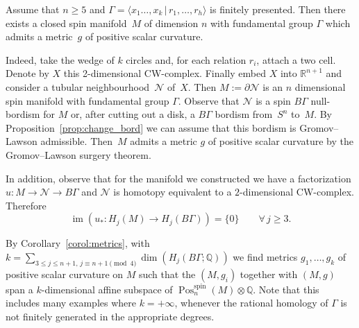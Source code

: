 \documentclass[pdftex]{sigma}
\numberwithin{equation}{section}
\def\QQ{\ensuremath{\mathbb{Q}}}
\def\RR{\ensuremath{\mathbb{R}}}
\newcommand{\rationals}{\mathbb{Q}}
\newcommand{\tensor}{\otimes}
\DeclareMathOperator{\Pos}{Pos}
\DeclareMathOperator{\im}{im}
\DeclareMathOperator{\spin}{spin}
\begin{document}
\begin{Example}\label{ex:given_pi1}
 Assume that $n\ge 5$ and $\Gamma=\langle x_1\dots,x_k\,|\,
 r_1,\dots,r_h\rangle$ is finitely presented. Then there
 exists a closed spin manifold~$M$ of dimension $n$ with fundamental group
 $\Gamma$ which admits a metric~$g$ of positive scalar curvature.

 Indeed, take the wedge of $k$ circles and, for each relation
 $r_i$, attach a two cell. Denote by $X$ this 2-dimensional CW-complex. Finally
 embed $X$ into $\RR^{n+1}$ and consider a
 tubular neighbour\-hood~$\mathcal{N}$ of~$X$. Then
 $M:=\partial\mathcal{N}$ is an $n$ dimensional spin manifold
 with fundamental group $\Gamma$. Observe that $\mathcal{N}$ is
 a spin $B\Gamma$ null-bordism for $M$ or, after cutting out a disk, a
 $B\Gamma$ bordism from~$S^n$ to~$M$. By Proposition~\ref{prop:change_bord} we can
 assume that this bordism is Gromov--Lawson admissible. Then~$M$ admits a metric
 $g$ of positive scalar curvature by the Gromov--Lawson
 surgery theorem.

 In addition, observe that for the manifold we constructed we have a
 factorization $u\colon M\to \mathcal{N}\to B\Gamma$ and $\mathcal{N}$ is
 homotopy equivalent to a $2$-dimensional CW-complex. Therefore
 \begin{equation*}
 \im(u_*\colon H_j(M)\to H_j(B\Gamma))=\{0\}\qquad\forall\, j\ge 3.
 \end{equation*}

 By Corollary~\ref{corol:metrics}, with $k= \sum_{3\le j\le n+1,\, j\equiv
 n+1\pmod 4} \dim(H_j(B\Gamma;\QQ))$ we find metrics $g_1,\dots,g_k$ of
 positive scalar curvature on $M$ such that the $(M,g_i)$ together with $(M,g)$
 span a $k$-dimensional affine subspace of
 $\Pos^{\spin}_n(M)\tensor\rationals$. Note that this includes many examples
 where $k=+\infty$, whenever the rational homology of $\Gamma$ is not finitely
 generated in the appropriate degrees.
\end{Example}
\end{document}
